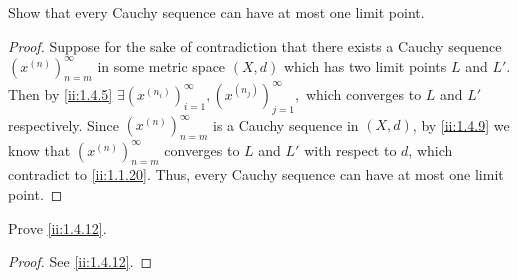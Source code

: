 \begin{ex}\label{ii:ex:1.4.6}
  Show that every Cauchy sequence can have at most one limit point.
\end{ex}

\begin{proof}
  Suppose for the sake of contradiction that there exists a Cauchy sequence \((x^{(n)})_{n = m}^\infty\) in some metric space \((X, d)\) which has two limit points \(L\) and \(L'\).
  Then by \cref{ii:1.4.5} \(\exists (x^{(n_i)})_{i = 1}^\infty, (x^{(n_j)})_{j = 1}^\infty,\) which converges to \(L\) and \(L'\) respectively.
  Since \((x^{(n)})_{n = m}^\infty\) is a Cauchy sequence in \((X, d)\), by \cref{ii:1.4.9} we know that \((x^{(n)})_{n = m}^\infty\) converges to \(L\) and \(L'\) with respect to \(d\), which contradict to \cref{ii:1.1.20}.
  Thus, every Cauchy sequence can have at most one limit point.
\end{proof}

\begin{ex}\label{ii:ex:1.4.7}
  Prove \cref{ii:1.4.12}.
\end{ex}

\begin{proof}
  See \cref{ii:1.4.12}.
\end{proof}

